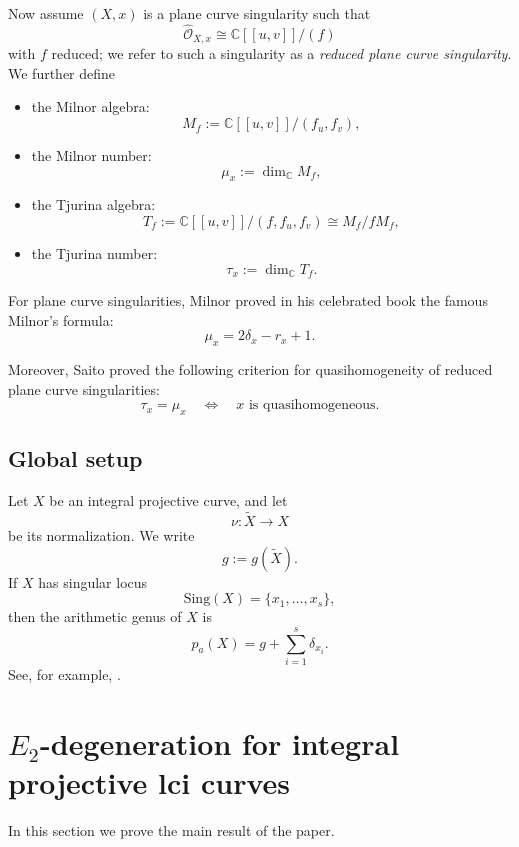 \documentclass[12pt,reqno]{amsart}
\begin{document}
Now assume \((X,x)\) is a plane curve singularity such that
\[
\widehat{\mathcal O}_{X,x}\cong \mathbb{C}[[u,v]]/(f)
\]
with \(f\) reduced; we refer to such a singularity as a \emph{reduced plane curve singularity}. We further define

\begin{itemize}
  \item the Milnor algebra:
    \[
    M_f:=\mathbb{C}[[u,v]]/(f_u,f_v),
    \]
  \item the Milnor number:
    \[
    \mu_x:=\dim_{\mathbb{C}}M_f,
    \]
  \item the Tjurina algebra:
    \[
    T_f:=\mathbb{C}[[u,v]]/(f,f_u,f_v)\cong M_f/fM_f,
    \]
  \item the Tjurina number:
    \[
    \tau_x:=\dim_{\mathbb{C}}T_f.
    \]
\end{itemize}

For plane curve singularities, Milnor proved in his celebrated book \cite[\S~10]{Milnor_68} the famous Milnor's formula:
\begin{equation}\label{eq:milnor-formula}
\mu_x=2\delta_x-r_x+1.
\end{equation}

Moreover, Saito \cite{Saito_71} proved the following criterion for quasihomogeneity of reduced plane curve singularities:
\begin{equation}\label{eq:tau-mu-qh}
\tau_x=\mu_x
\quad\Longleftrightarrow\quad
x \text{ is quasihomogeneous}.
\end{equation}

\subsection{Global setup}

Let $X$ be an integral projective curve, and let
\[
\nu:\widetilde X\to X
\]
be its normalization. We write
\[
g:=g(\widetilde X).
\]
If $X$ has singular locus
\[
\mathrm{Sing}(X)=\{x_1,\dots,x_s\},
\]
then the arithmetic genus of \(X\) is 
\[
p_a(X)=g+\sum_{i=1}^s \delta_{x_i}.
\]
See, for example, \cite[Chapter~IV]{Hartshorne_77}.

\section{\texorpdfstring{$E_2$}{E2}-degeneration for integral projective lci curves}\label{sec:e2-degeneration}

In this section we prove the main result of the paper.
\end{document}
